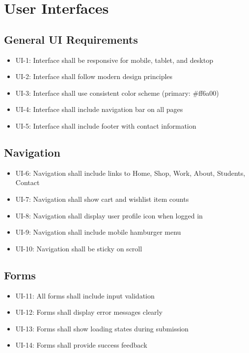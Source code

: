 \documentclass{scrreprt}
\begin{document}
\section{User Interfaces}

\subsection{General UI Requirements}
\begin{itemize}
\item UI-1: Interface shall be responsive for mobile, tablet, and desktop
\item UI-2: Interface shall follow modern design principles
\item UI-3: Interface shall use consistent color scheme (primary: \#ff6a00)
\item UI-4: Interface shall include navigation bar on all pages
\item UI-5: Interface shall include footer with contact information
\end{itemize}

\subsection{Navigation}
\begin{itemize}
\item UI-6: Navigation shall include links to Home, Shop, Work, About, Students, Contact
\item UI-7: Navigation shall show cart and wishlist item counts
\item UI-8: Navigation shall display user profile icon when logged in
\item UI-9: Navigation shall include mobile hamburger menu
\item UI-10: Navigation shall be sticky on scroll
\end{itemize}

\subsection{Forms}
\begin{itemize}
\item UI-11: All forms shall include input validation
\item UI-12: Forms shall display error messages clearly
\item UI-13: Forms shall show loading states during submission
\item UI-14: Forms shall provide success feedback
\end{itemize}
\end{document}
